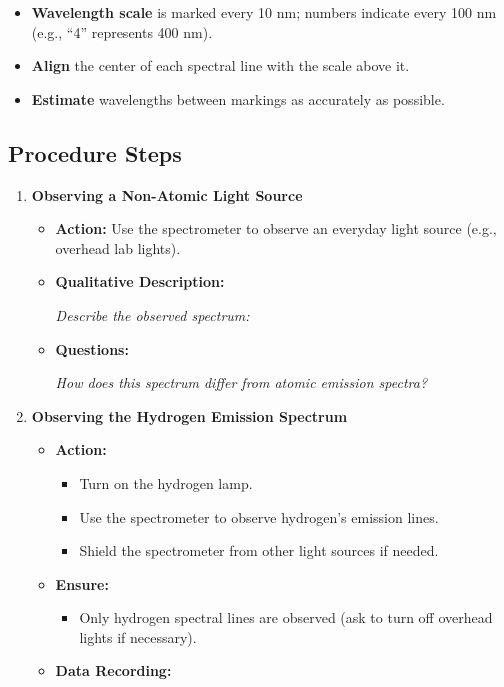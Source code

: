 \documentclass{article}
\begin{document}
\begin{itemize}
    \item \textbf{Wavelength scale} is marked every 10 nm; numbers indicate every 100 nm (e.g., ``4'' represents 400 nm).
    \item \textbf{Align} the center of each spectral line with the scale above it.
    \item \textbf{Estimate} wavelengths between markings as accurately as possible.
\end{itemize}

\subsection*{Procedure Steps}

\begin{enumerate}
    \item \textbf{Observing a Non-Atomic Light Source}
    
    \begin{itemize}
        \item \textbf{Action:} Use the spectrometer to observe an everyday light source (e.g., overhead lab lights).
        \item \textbf{Qualitative Description:}
        
        \vspace{1cm}
        \textit{Describe the observed spectrum:}
        
        \vspace{4cm}
        
        \item \textbf{Questions:}
        
        \textit{How does this spectrum differ from atomic emission spectra?}
        
        \vspace{4cm}
    \end{itemize}
    
    \item \textbf{Observing the Hydrogen Emission Spectrum}
    
    \begin{itemize}
        \item \textbf{Action:}
        \begin{itemize}
            \item Turn on the hydrogen lamp.
            \item Use the spectrometer to observe hydrogen's emission lines.
            \item Shield the spectrometer from other light sources if needed.
        \end{itemize}
        \item \textbf{Ensure:}
        \begin{itemize}
            \item Only hydrogen spectral lines are observed (ask to turn off overhead lights if necessary).
        \end{itemize}
        \item \textbf{Data Recording:}
        

\end{itemize}
\end{enumerate}
\end{document}
